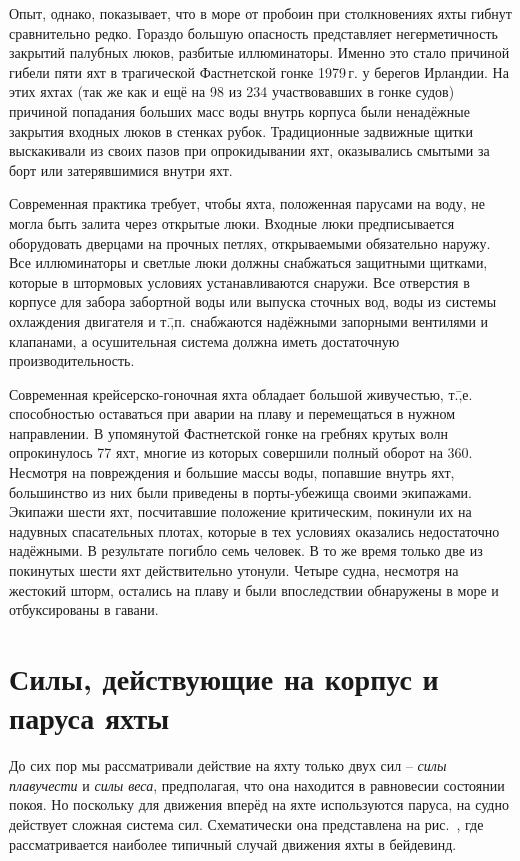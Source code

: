 Опыт, однако, показывает, что в море от пробоин при столкновениях яхты
гибнут сравнительно редко. Гораздо большую опасность представляет
негерметичность закрытий палубных люков, разбитые иллюминаторы. Именно
это стало причиной гибели пяти яхт в трагической Фастнетской гонке
1979\,г. у берегов Ирландии. На этих яхтах (так же как и ещё на 98 из
234 участвовавших в гонке судов) причиной попадания больших масс воды
внутрь корпуса были ненадёжные закрытия входных люков в стенках
рубок. Традиционные задвижные щитки выскакивали из своих пазов при
опрокидывании яхт, оказывались смытыми за борт или затерявшимися
внутри яхт.

Современная практика требует, чтобы яхта, положенная парусами на воду,
не могла быть залита через открытые люки. Входные люки предписывается
оборудовать дверцами на прочных петлях, открываемыми обязательно
наружу. Все иллюминаторы и светлые люки должны снабжаться защитными
щитками, которые в штормовых условиях устанавливаются снаружи. Все
отверстия в корпусе для забора забортной воды или выпуска сточных вод,
воды из системы охлаждения двигателя и т.\=,п. снабжаются надёжными
запорными вентилями и клапанами, а осушительная система должна иметь
достаточную производительность.

Современная крейсерско-гоночная яхта обладает большой живучестью,
т.\=,е. способностью оставаться при аварии на плаву и перемещаться в
нужном направлении. В упомянутой Фастнетской гонке на гребнях крутых
волн опрокинулось 77 яхт, многие из которых совершили полный оборот на
360\gr. Несмотря на повреждения и большие массы воды, попавшие внутрь
яхт, большинство из них были приведены в порты-убежища своими
экипажами. Экипажи шести яхт, посчитавшие положение критическим,
покинули их на надувных спасательных плотах, которые в тех условиях
оказались недостаточно надёжными. В результате погибло семь человек. В
то же время только две из покинутых шести яхт действительно
утонули. Четыре судна, несмотря на жестокий шторм, остались на плаву и
были впоследствии обнаружены в море и отбуксированы в гавани.

\section{Силы, действующие на корпус и паруса яхты}

До сих пор мы рассматривали действие на яхту только двух сил \--- \textit{силы
плавучести} и \textit{силы веса},
предполагая, что она находится в равновесии состоянии покоя. Но
поскольку для движения вперёд на яхте используются паруса, на судно
действует сложная система сил. Схематически она представлена на
рис.~, где рассматривается наиболее типичный случай движения
яхты в бейдевинд.

